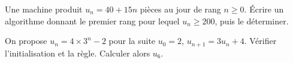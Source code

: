 \documentclass[11pt,a4paper]{article}
\begin{document}
\par\noindent\begin{minipage}{\linewidth}
Une machine produit $u_n=40+15n$ pièces au jour de rang $n\ge0$. Écrire un algorithme donnant le premier rang pour lequel $u_n\ge200$, puis le déterminer.
\end{minipage}\par
\par\noindent\begin{minipage}{\linewidth}
On propose $u_n=4\times3^n-2$ pour la suite $u_0=2$, $u_{n+1}=3u_n+4$. Vérifier l’initialisation et la règle. Calculer alors $u_6$.
\end{minipage}\par
\end{document}
